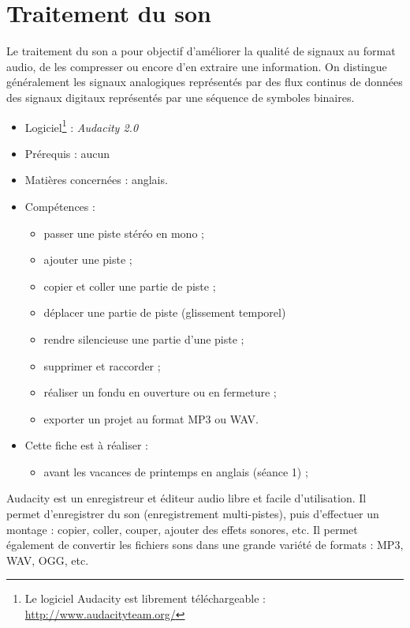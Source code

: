\chapter{Traitement du son}  

Le traitement du son a pour objectif d'améliorer la qualité de signaux au format audio, de les compresser ou encore d'en extraire une information. On distingue généralement les signaux analogiques représentés par des flux continus de données des signaux digitaux représentés par une séquence de symboles binaires.

{\footnotesize
\begin{itemize}
\item Logiciel\footnote{Le logiciel Audacity est librement téléchargeable : \url{http://www.audacityteam.org/}} : \emph{Audacity 2.0} 
\item Prérequis : aucun
\item Matières concernées : anglais.
\item Compétences : 
        \begin{itemize}
        \item passer une piste stéréo en mono ;
        \item ajouter une piste ;
        \item copier et coller une partie de piste ;
        \item déplacer une partie de piste (glissement temporel)
        \item rendre silencieuse une partie d'une piste ;
        \item supprimer et raccorder ;
        \item réaliser un fondu en ouverture ou en fermeture ;
        \item exporter un projet au format MP3 ou WAV.
        \end{itemize}
\item Cette fiche est à réaliser :
        \begin{itemize}
        \item avant les vacances de printemps en anglais (séance 1) ;
        \end{itemize}
\end{itemize}
}%




Audacity est un enregistreur et éditeur audio libre et facile d'utilisation. Il permet d'enregistrer du son (enregistrement multi-pistes), puis d'effectuer un montage : copier, coller, couper, ajouter des effets sonores, etc. Il permet également de convertir les fichiers sons dans une grande variété de formats : MP3, WAV, OGG, etc. 





